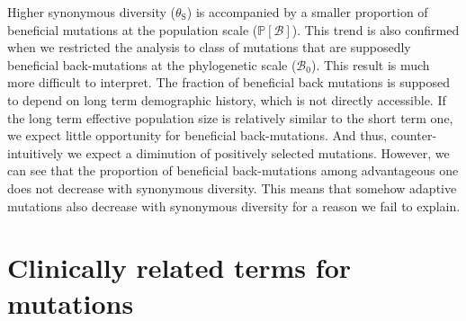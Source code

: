 \documentclass[12pt]{article}
\newcommand{\proba}{\mathbb{P}}
\newcommand{\SphyBen}{\mathcal{B}_0}
\newcommand{\SpopBen}{\mathcal{B}}
\newcommand{\thetaSyn}{\theta_{\text{S}}}
\begin{document}
    Higher synonymous diversity ($\thetaSyn$) is accompanied by a smaller proportion of beneficial mutations at the population scale ($\proba [ \SpopBen ]$).
    This trend is also confirmed when we restricted the analysis to class of mutations that are supposedly beneficial back-mutations at the phylogenetic scale ($\SphyBen$).
    This result is much more difficult to interpret.
    The fraction of beneficial back mutations is supposed to depend on long term demographic history, which is not directly accessible.
    If the long term effective population size is relatively similar to the short term one, we expect little opportunity for beneficial back-mutations.
    And thus, counter-intuitively we expect a diminution of positively selected mutations.
    However, we can see that the proportion of beneficial back-mutations among advantageous one does not decrease with synonymous diversity.
    This means that somehow adaptive mutations also decrease with synonymous diversity for a reason we fail to explain.

    \newpage

    \section{Clinically related terms for mutations}
\end{document}
